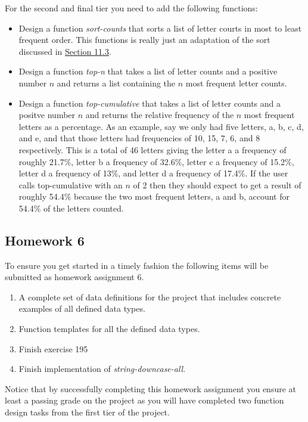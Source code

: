 \documentclass[nobib]{tufte-handout}
\begin{document}
For the second and final tier you need to add the following functions:
\begin{itemize}
  \item Design a function \textit{sort-counts} that sorts a list of letter courts in most to least frequent order. This functions is really just an adaptation of the sort discussed in \href{http://htdp.org/2018-01-06/Book/part_two.html#%28part._sec~3asort.I%29}{Section 11.3}.

  \item Design a function \textit{top-n} that takes a list of letter counts and a positive number \(n\) and returns a list containing the \(n\) most frequent letter counts.

  \item Design a function \textit{top-cumulative} that takes a list of letter counts and a positve number \(n\) and returns the relative frequency of the \(n\) most frequent letters as a percentage. As an example, say we only had five letters, a, b, c, d, and e, and that those letters had frequencies of 10, 15, 7, 6, and 8 respectively. This is a total of 46 letters giving the letter a a frequency of roughly 21.7\%, letter b a frequency of 32.6\%, letter c a frequency  of 15.2\%, letter d a frequency of 13\%, and letter d a frequency of 17.4\%. If the user calls top-cumulative with an \(n\) of 2 then they should expect to get a result of roughly 54.4\% because the two most frequent letters, a and b, account for 54.4\% of the letters counted.
\end{itemize}

\subsection{Homework 6}

To ensure you get started in a timely fashion the following items will be submitted as homework assignment 6.
\begin{enumerate}
  \item A complete set of data definitions for the project that includes concrete examples of all defined data types.
  \item Function templates for all the defined data types.
  \item Finish exercise 195
  \item Finish implementation of \textit{string-downcase-all}.
\end{enumerate}

Notice that by successfully completing this homework assignment you ensure at least a passing grade on the project as you will have completed two function design tasks from the first tier of the project.
\end{document}
